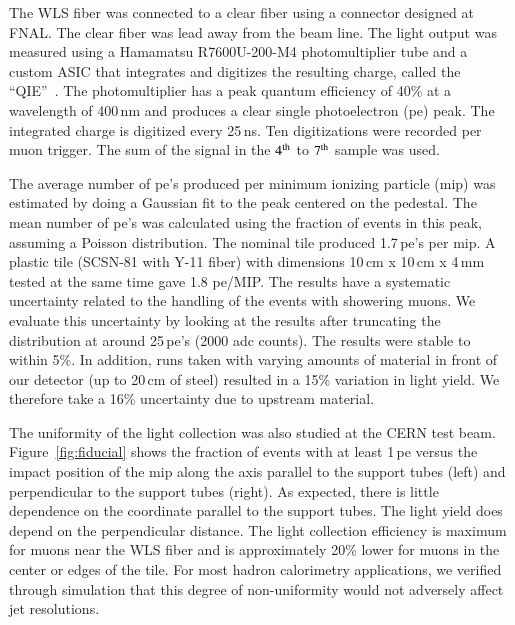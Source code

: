 \documentclass[review]{elsarticle}
\begin{document}
The WLS fiber was connected to a clear fiber using a
connector designed at FNAL. The clear fiber was lead away from the
beam line. The light output was measured using a Hamamatsu
R7600U-200-M4 photomultiplier tube and a custom ASIC that integrates
and digitizes the resulting charge, called the ``QIE''~\cite{qie}.
The photomultiplier has a peak quantum efficiency of 40\% at a
wavelength of 400\,nm and produces a clear single photoelectron (pe)
peak. The integrated charge is digitized every 25\,ns. Ten
digitizations were recorded per muon trigger. The sum of the signal
in the ${\rm 4^{th}}$ to ${\rm 7^{th}}$ sample was used.

The average number of pe's produced per minimum ionizing particle
(mip) was estimated by doing a Gaussian fit to the peak centered on
the pedestal. The mean number of pe's was calculated using the
fraction of events in this peak, assuming a Poisson distribution. The
nominal tile produced 1.7\,pe's per mip.
A plastic tile (SCSN-81 with Y-11 fiber) with dimensions 10\,cm x 10\,cm x 4\,mm tested
at the same time gave 1.8 pe/MIP.
The results
have a systematic uncertainty related to the handling of the events
with showering muons. We evaluate this uncertainty by looking at the
results after truncating the distribution at around 25\,pe's (2000 adc
counts). The results were stable to within 5\%. In addition, runs
taken with varying amounts of material in front of our detector
(up to 20\,cm of steel)
resulted in a 15\% variation in light yield.
We therefore take a 16\% uncertainty due to upstream material.

The uniformity of the light collection was also studied at the CERN
test beam. Figure~\ref{fig:fiducial} shows the fraction of events with at
least 1\,pe versus the impact position of the mip along the axis
parallel to the support tubes (left) and perpendicular to the support
tubes (right). As expected, there is little dependence on the
coordinate parallel to the support tubes. The light yield does depend
on the perpendicular distance. The light collection efficiency is
maximum for muons near the WLS fiber and is approximately 20\%
lower for muons in the center or edges of the tile. For most hadron
calorimetry applications, we verified through simulation that this
degree of non-uniformity would not adversely affect jet resolutions.
\end{document}
